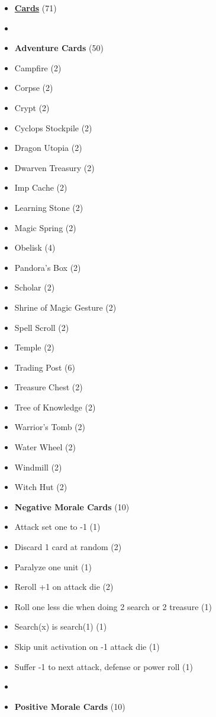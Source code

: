 \begin{multicols}{3}
\begin{itemize}[leftmargin=0pt, label={}, noitemsep]
  \item \textbf{\small{\underline{Cards}}} (71)
  \item
  \item \textbf{Adventure Cards} (50)
  \item Campfire (2)
  \item Corpse (2)
  \item Crypt (2)
  \item Cyclops Stockpile (2)
  \item Dragon Utopia (2)
  \item Dwarven Treasury (2)
  \item Imp Cache (2)
  \item Learning Stone (2)
  \item Magic Spring (2)
  \item Obelisk (4)
  \item Pandora's Box (2)
  \item Scholar (2)
  \item Shrine of Magic Gesture (2)
  \item Spell Scroll (2)
  \item Temple (2)
  \item Trading Post (6)
  \item Treasure Chest (2)
  \item Tree of Knowledge (2)
  \item Warrior's Tomb (2)
  \item Water Wheel (2)
  \item Windmill (2)
  \item Witch Hut (2)
\columnbreak
  \item \textbf{Negative Morale Cards} (10)
  \item Attack set one to -1 (1)
  \item Discard 1 card at random (2)
  \item Paralyze one unit (1)
  \item Reroll +1 on attack die (2)
  \item Roll one less die when doing 2 search or 2 treasure (1)
  \item Search(x) is search(1) (1)
  \item Skip unit activation on -1 attack die (1)
  \item Suffer -1 to next attack, defense or power roll (1)
  \item
  \item \textbf{Positive Morale Cards} (10)

\end{itemize}
\end{multicols}
